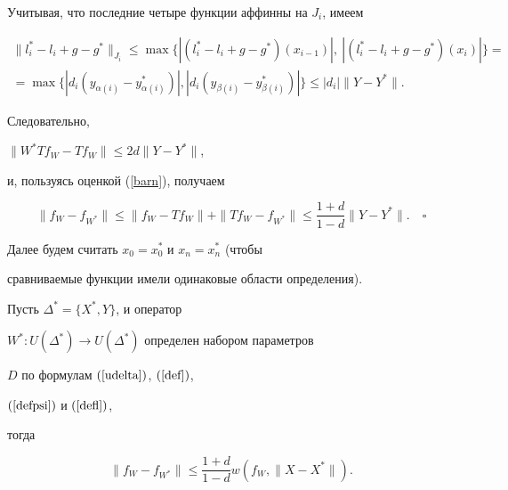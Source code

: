 Учитывая, что последние четыре функции аффинны на $J_i$, имеем


\begin{multline*}


\| l_i^* - l_i + g - g^* \|_{J_i} \le


\max\{ | (l_i^* - l_i + g - g^*) (x_{i-1})|,\ |(l_i^* - l_i


 + g - g^*) (x_{i}) | \} = \\


%


= \max\{ | d_i(y_{\alpha(i)}-y^*_{\alpha(i)}) | ,


| d_i(y_{\beta(i)}-y^*_{\beta(i)}) | \}


\le | d_i | \|Y-Y^*\|.


\end{multline*}


Следовательно,


$\| W^* Tf_W - Tf_W \| \le 2d\|Y-Y^*\|$,


и, пользуясь оценкой (\ref{barn}), получаем


$$


\|f_W -f_{W^*}\| \le \|f_W - T f_W \| +


\| Tf_W - f_{W^*}\| \le \frac{1+d}{1-d} \|Y-Y^*\|.\quad\square


$$





Далее будем считать $x_0=x_0^*$ и $ x_n =x_n^* $ (чтобы


сравниваемые функции имели одинаковые области определения).





\begin{lem} \label{lusx}


Пусть $\Delta^*=\{ X^*,Y \}$, и оператор


$W^* : U (\Delta^*) \to U (\Delta^*)$ определен набором параметров


$D$ по формулам $(\ref{udelta})$, $(\ref{def})$,


$(\ref{defpsi})$ и $(\ref{defl})$,


тогда


$$




\| f_W- f_{W^*} \| \le \frac {1+d}{1-d} w(f_W , \| X - X^* \|).




$$


\end{lem}





